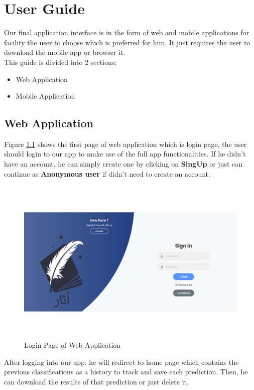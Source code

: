 \chapter{User Guide}
Our final application interface is in the form of web and mobile applications for facility the user to choose which is preferred for him. It just requires the user to download the mobile app or browser it. \\

\noindent
This guide is divided into 2 sections:
\begin{itemize}[itemsep=1pt, topsep=5pt]
    \item Web Application
    \item Mobile Application
\end{itemize}

\section{Web Application}
Figure \ref{fig:web-login-page} shows the first page of web application which is login page, the user should login to our app to make use of the full app functionalities. If he didn't have an account, he can simply create one by clicking on \textbf{SingUp} or just can continue as \textbf{Anonymous user} if didn't need to create an account.

\begin{figure}[!htb]
    \centering
    \includegraphics[width=17cm,height=8cm]{images/app/web/web-1.PNG}
    \caption{Login Page of Web Application}
    \label{fig:web-login-page}
\end{figure}

After logging into our app, he will redirect to home page which contains the previous classifications as a history to track and save each prediction. Then, he can download the results of that prediction or just delete it.

